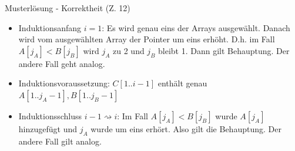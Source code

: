 \documentclass[18pt]{beamer}
\begin{document}
\begin{frame}{Musterlösung - Korrektheit (Z. 12)}
\begin{itemize}
 \item Induktionsanfang $i=1$: Es wird genau eins der Arrays ausgewählt. Danach wird vom ausgewählten Array der Pointer um eins erhöht. D.h. im Fall $A[j_A] < B[j_B]$ wird $j_A$ zu 2 und $j_B$ bleibt 1. Dann gilt Behauptung. Der andere Fall geht analog.
 \item Induktionsvoraussetzung: $C[1..i-1]$ enthält genau $A[1..j_A-1], B[1..j_B-1]$ 
 \item 	Induktionsschluss $i-1 \rightsquigarrow i$: Im Fall $A[j_A] < B[j_B]$ wurde $A[j_A]$ hinzugefügt und $j_A$ wurde um eins erhört. Also gilt die Behauptung. Der andere Fall gilt analog.
\end{itemize}	
\end{frame}
\end{document}
